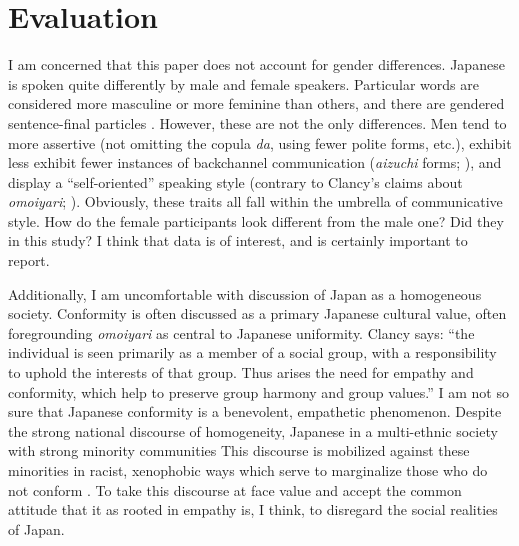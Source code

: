 \documentclass[man,12pt,natbib]{apa6}
\begin{document}
\section{Evaluation}

I am concerned that this paper does not account for gender differences.
Japanese is spoken quite differently by male and female speakers. Particular
words are considered more masculine or more feminine than others, and there are
gendered sentence-final particles \citep{Siegal03}. However, these are not the
only differences. Men tend to more assertive (not omitting the copula
\emph{da}, using fewer polite forms, etc.), exhibit less exhibit fewer
instances of backchannel communication (\emph{aizuchi} forms;
\citealp{Kita07,Tanaka04}), and display a ``self-oriented'' speaking style
(contrary to Clancy's claims about \emph{omoiyari}; \citealp{Itakura04}).
Obviously, these traits all fall within the umbrella of communicative style.
How do the female participants look different from the male one? Did they in
this study? I think that data is of interest, and is certainly important to
report.

Additionally, I am uncomfortable with discussion of Japan as a homogeneous
society. Conformity is often discussed as a primary Japanese cultural value,
often foregrounding \emph{omoiyari} as central to Japanese uniformity. Clancy
says: ``the individual is seen primarily as a member of a social group, with a
responsibility to uphold the interests of that group. Thus arises the need for
empathy and conformity, which help to preserve group harmony and group
values.'' I am not so sure that Japanese conformity is a benevolent, empathetic
phenomenon.  Despite the strong national discourse of homogeneity, Japanese in
a multi-ethnic society with strong minority communities \citep{Lie01} This
discourse is mobilized against these minorities in racist, xenophobic ways
which serve to marginalize those who do not conform \citep{Diene06}. To take
this discourse at face value and accept the common attitude that it as rooted
in empathy is, I think, to disregard the social realities of Japan.

\clearpage

\end{document}
